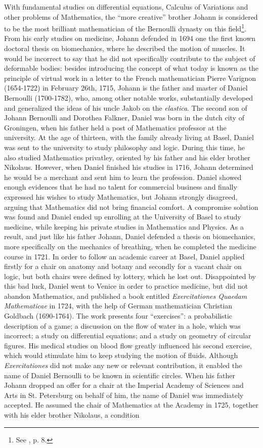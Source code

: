 With fundamental studies on differential equations, Calculus of Variations and other problems of Mathematics, the ``more creative'' brother Johann is considered to be the most brilliant mathematician of the Bernoulli dynasty on this field\footnote{See \cite{maugin_2014}, p. 8.}. From his early studies on medicine, Johann defended in 1694 one the first known doctoral thesis on biomechanics, where he described the motion of muscles. It would be incorrect to say that he did not specifically contribute to the subject of deformable bodies: besides introducing the concept of  what today is known as the principle of virtual work in a letter to the French mathematician Pierre Varignon (1654-1722) in February 26th, 1715, Johann is the father and master of Daniel Bernoulli (1700-1782), who, among other notable works, substantially developed and generalized the ideas of his uncle Jakob on the \emph{elastica}. The second son of Johann Bernoulli and Dorothea Falkner, Daniel was born in the dutch city of Groningen, when his father held a post of Mathematics professor at the university. At the age of thirteen, with the family already living at Basel, Daniel was sent to the university to study philosophy and logic. During this time, he also studied Mathematics privatley, oriented by his father and his elder brother Nikolaus. However, when Daniel finished his studies in 1716, Johann determined he would be a merchant and sent him to learn the profession. Daniel showed enough evidences that he had no talent for commercial business and finally expressed his wishes to study Mathematics, but Johann strongly disagreed, arguing that Mathematics did not bring financial comfort. A compromise solution was found and Daniel ended up enrolling at the University of Basel to study medicine, while keeping his private studies in Mathematics and Physics. As a result, and just like his father Johann, Daniel defended a thesis on biomechanics, more specifically on the mechanics of breathing, when he completed the medicine course in 1721. In order to follow an academic career at Basel, Daniel applied firstly for a chair on anatomy and botany and secondly for a vacant chair on logic, but both chairs were defined by lottery, which he lost out. Disappointed by this bad luck, Daniel went to Venice in order to practice medicine, but did not abandon Mathematics, and published a book entitled \emph{Exercitationes Quaedam Mathematicae} in 1724, with the help of German mathematician Christian Goldbach (1690-1764). The work presents four ``exercises'': a probabilistic description of a game; a discussion on the flow of water in a hole, which was incorrect; a study on differential equations; and a study on geometry of circular figures. His medical studies on blood flow greatly influenced his second exercise, which would stimulate him to keep studying the motion of fluids. Although \emph{Exercitationes} did not make any new or relevant contribution, it enabled the name of Daniel Bernoulli to be known in scientific circles. When his father Johann dropped an offer for a chair at the Imperial Academy of Sciences and Arts in St. Petersburg on behalf of him, the name of Daniel was immediately accepted. He assumed the chair of Mathematics at the Academy in 1725, together with his elder brother Nikolaus, a condition 